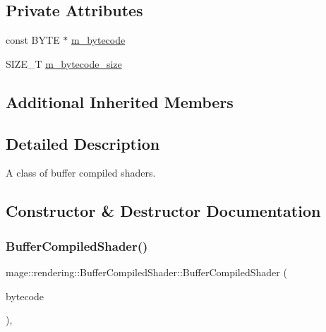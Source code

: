 \subsection*{Private Attributes}
\begin{DoxyCompactItemize}
\item 
const B\+Y\+TE $\ast$ \mbox{\hyperlink{classmage_1_1rendering_1_1_buffer_compiled_shader_a6caa56491d81612c3eaec789d8e341bc}{m\+\_\+bytecode}}
\item 
S\+I\+Z\+E\+\_\+T \mbox{\hyperlink{classmage_1_1rendering_1_1_buffer_compiled_shader_a176f35c25e3a4de26b0334ffdc53da73}{m\+\_\+bytecode\+\_\+size}}
\end{DoxyCompactItemize}
\subsection*{Additional Inherited Members}


\subsection{Detailed Description}
A class of buffer compiled shaders. 

\subsection{Constructor \& Destructor Documentation}
\mbox{\label{classmage_1_1rendering_1_1_buffer_compiled_shader_ae2a2ce1b29d89125d6413ea9bf773694}} 
\subsubsection{\texorpdfstring{Buffer\+Compiled\+Shader()}{BufferCompiledShader()}\hspace{0.1cm}{\footnotesize\ttfamily [1/3]}}
{\footnotesize\ttfamily mage\+::rendering\+::\+Buffer\+Compiled\+Shader\+::\+Buffer\+Compiled\+Shader (\begin{DoxyParamCaption}\item[{gsl\+::span$<$ const B\+Y\+TE $>$}]{bytecode }\end{DoxyParamCaption})\hspace{0.3cm}{\ttfamily [explicit]}, {\ttfamily [noexcept]}}

